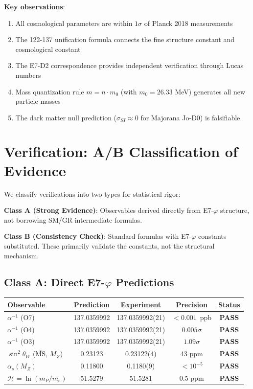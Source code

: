 \documentclass[11pt,a4paper]{article}
\begin{document}
\textbf{Key observations}:
\begin{enumerate}
\item All cosmological parameters are within $1\sigma$ of Planck 2018 measurements~\cite{Planck2018}
\item The 122-137 unification formula connects the fine structure constant and cosmological constant
\item The E7-D2 correspondence provides independent verification through Lucas numbers
\item Mass quantization rule $m = n \cdot m_0$ (with $m_0 = 26.33$ MeV) generates all new particle masses
\item The dark matter null prediction ($\sigma_{SI} \approx 0$ for Majorana Jo-D0) is falsifiable
\end{enumerate}

\section{Verification: A/B Classification of Evidence}

We classify verifications into two types for statistical rigor:

\textbf{Class A (Strong Evidence)}: Observables derived directly from E7-$\varphi$ structure, not borrowing SM/GR intermediate formulas.

\textbf{Class B (Consistency Check)}: Standard formulas with E7-$\varphi$ constants substituted. These primarily validate the constants, not the structural mechanism.

\subsection{Class A: Direct E7-$\varphi$ Predictions}

\begin{center}
\begin{tabular}{|l|c|c|c|c|}
\hline
\textbf{Observable} & \textbf{Prediction} & \textbf{Experiment} & \textbf{Precision} & \textbf{Status} \\
\hline
$\alpha^{-1}$ (O7) & 137.0359992 & 137.0359992(21) & $< 0.001$~ppb & \textbf{PASS} \\
$\alpha^{-1}$ (O4) & 137.0359992 & 137.0359992(21) & $0.005\sigma$ & \textbf{PASS} \\
$\alpha^{-1}$ (O3) & 137.0359992 & 137.0359992(21) & $1.09\sigma$ & \textbf{PASS} \\
$\sin^2\theta_W$ ($\overline{\text{MS}}$, $M_Z$) & 0.23123 & 0.23122(4) & 43 ppm & \textbf{PASS} \\
$\alpha_s(M_Z)$ & 0.11800 & 0.1180(9) & $< 10^{-5}$ & \textbf{PASS} \\
$\mathcal{H} = \ln(m_P/m_e)$ & 51.5279 & 51.5281 & 0.5 ppm & \textbf{PASS} \\
\hline
\end{tabular}
\end{center}
\end{document}
